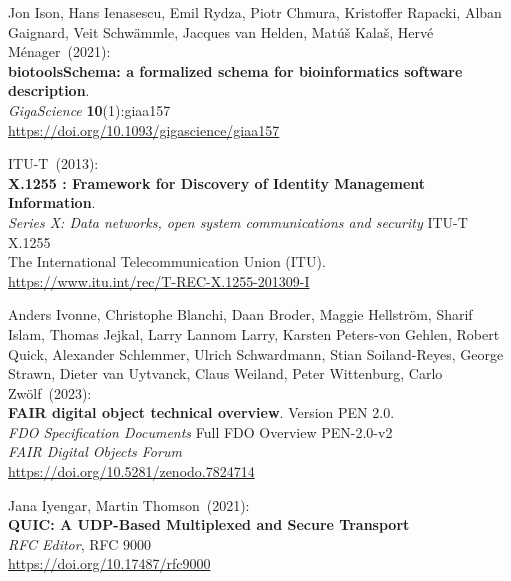 \begin{thebibliography}{9}
Jon Ison, Hans Ienasescu, Emil Rydza, Piotr Chmura, Kristoffer
Rapacki, Alban Gaignard, Veit Schwämmle, Jacques van Helden, Matúš
Kalaš, Hervé Ménager~(2021): \\
\textbf{biotoolsSchema: a formalized schema for bioinformatics software description}.\\
\emph{GigaScience} \textbf{10}(1):giaa157\\
\url{https://doi.org/10.1093/gigascience/giaa157}

ITU-T~(2013): \\
\textbf{X.1255 : Framework for Discovery of Identity Management Information}.\\
\emph{Series X: Data networks, open system communications and security} ITU-T X.1255 \\
The International Telecommunication Union (ITU).\\
\url{https://www.itu.int/rec/T-REC-X.1255-201309-I}

Anders Ivonne, Christophe Blanchi, Daan Broder, Maggie Hellström, Sharif Islam, Thomas Jejkal, Larry Lannom Larry, Karsten Peters-von Gehlen, Robert Quick,
Alexander Schlemmer, Ulrich Schwardmann, Stian Soiland-Reyes,
George Strawn, Dieter van Uytvanck, Claus Weiland, Peter Wittenburg,
Carlo Zwölf~(2023): \\
\textbf{{FAIR} digital object technical overview}. Version PEN 2.0.\\
\emph{FDO Specification Documents} Full FDO Overview PEN-2.0-v2 \\
\emph{FAIR Digital Objects Forum}\\
\url{https://doi.org/10.5281/zenodo.7824714}

Jana Iyengar, Martin Thomson~(2021): \\
\textbf{{QUIC}: {A UDP-Based Multiplexed} and {Secure Transport}}\\
\emph{RFC Editor}, RFC 9000\\
\url{https://doi.org/10.17487/rfc9000}



\end{thebibliography}
